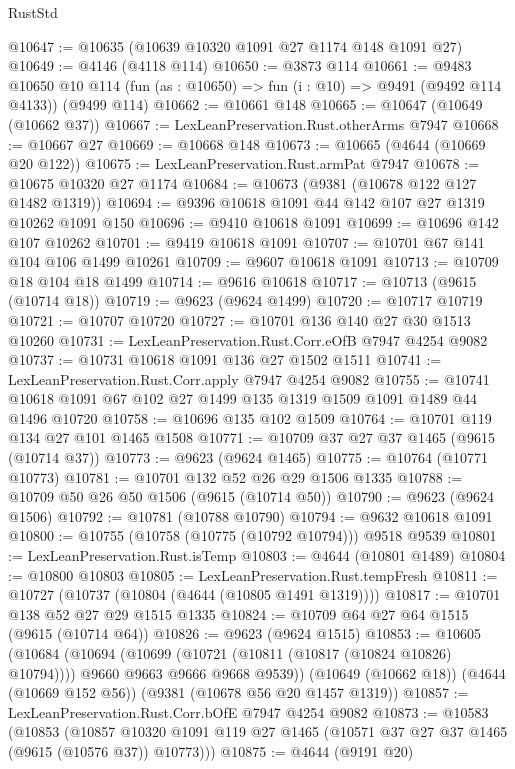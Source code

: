 \begin{lexlean}{RustStd}
\begin{coremodule}
@10647 := @10635 (@10639 @10320 @1091 @27 @1174 @148 @1091 @27)
@10649 := @4146 (@4118 @114)
@10650 := @3873 @114
@10661 := @9483
    @10650
    @10
    @114
    (fun (as : @10650) => fun (i : @10) => @9491 (@9492 @114 @4133))
    (@9499 @114)
@10662 := @10661 @148
@10665 := @10647 (@10649 (@10662 @37))
@10667 := LexLeanPreservation.Rust.otherArms @7947
@10668 := @10667 @27
@10669 := @10668 @148
@10673 := @10665 (@4644 (@10669 @20 @122))
@10675 := LexLeanPreservation.Rust.armPat @7947
@10678 := @10675 @10320 @27 @1174
@10684 := @10673 (@9381 (@10678 @122 @127 @1482 @1319))
@10694 := @9396 @10618 @1091 @44 @142 @107 @27 @1319 @10262 @1091 @150
@10696 := @9410 @10618 @1091
@10699 := @10696 @142 @107 @10262
@10701 := @9419 @10618 @1091
@10707 := @10701 @67 @141 @104 @106 @1499 @10261
@10709 := @9607 @10618 @1091
@10713 := @10709 @18 @104 @18 @1499
@10714 := @9616 @10618
@10717 := @10713 (@9615 (@10714 @18))
@10719 := @9623 (@9624 @1499)
@10720 := @10717 @10719
@10721 := @10707 @10720
@10727 := @10701 @136 @140 @27 @30 @1513 @10260
@10731 := LexLeanPreservation.Rust.Corr.eOfB @7947 @4254 @9082
@10737 := @10731 @10618 @1091 @136 @27 @1502 @1511
@10741 := LexLeanPreservation.Rust.Corr.apply @7947 @4254 @9082
@10755 := @10741 @10618 @1091 @67 @102 @27 @1499 @135 @1319 @1509 @1091 @1489 @44 @1496 @10720
@10758 := @10696 @135 @102 @1509
@10764 := @10701 @119 @134 @27 @101 @1465 @1508
@10771 := @10709 @37 @27 @37 @1465 (@9615 (@10714 @37))
@10773 := @9623 (@9624 @1465)
@10775 := @10764 (@10771 @10773)
@10781 := @10701 @132 @52 @26 @29 @1506 @1335
@10788 := @10709 @50 @26 @50 @1506 (@9615 (@10714 @50))
@10790 := @9623 (@9624 @1506)
@10792 := @10781 (@10788 @10790)
@10794 := @9632 @10618 @1091
@10800 := @10755 (@10758 (@10775 (@10792 @10794))) @9518 @9539
@10801 := LexLeanPreservation.Rust.isTemp
@10803 := @4644 (@10801 @1489)
@10804 := @10800 @10803
@10805 := LexLeanPreservation.Rust.tempFresh
@10811 := @10727 (@10737 (@10804 (@4644 (@10805 @1491 @1319))))
@10817 := @10701 @138 @52 @27 @29 @1515 @1335
@10824 := @10709 @64 @27 @64 @1515 (@9615 (@10714 @64))
@10826 := @9623 (@9624 @1515)
@10853 := @10605
    (@10684
      (@10694
        (@10699 (@10721 (@10811 (@10817 (@10824 @10826) @10794))))
        @9660
        @9663
        @9666
        @9668
        @9539))
    (@10649 (@10662 @18))
    (@4644 (@10669 @152 @56))
    (@9381 (@10678 @56 @20 @1457 @1319))
@10857 := LexLeanPreservation.Rust.Corr.bOfE @7947 @4254 @9082
@10873 := @10583
    (@10853
      (@10857 @10320 @1091 @119 @27 @1465 (@10571 @37 @27 @37 @1465 (@9615 (@10576 @37)) @10773)))
@10875 := @4644 (@9191 @20)

\end{coremodule}
\end{lexlean}
